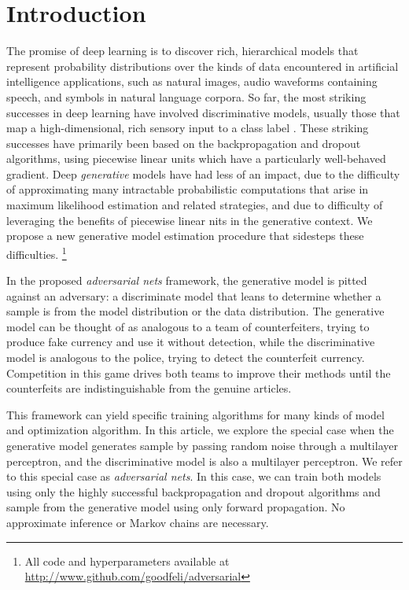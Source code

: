 \section{Introduction}
The promise of deep learning is to discover rich, hierarchical models \cite{2_MAL-006} that represent probability distributions over the kinds of data encountered in artificial intelligence applications, such as natural images, audio waveforms containing speech, and symbols in natural language corpora. So far, the most striking successes in deep learning have involved discriminative models, usually those that map a high-dimensional, rich sensory input to a class label \cite{14_6296526, 22_NIPS2012_c399862d}. These striking successes have primarily been based on the backpropagation and dropout algorithms, using piecewise linear units \cite{19_5459469,9_pmlr-v15-glorot11a,10_goodfellow2013maxoutnetworks} which have a particularly well-behaved gradient. Deep \emph{generative} models have had less of an impact, due to the difficulty of approximating many intractable probabilistic computations that arise in maximum likelihood estimation and related strategies, and due to difficulty of leveraging the benefits of piecewise linear nits in the generative context. We propose a new generative model estimation procedure that sidesteps these difficulties.
\footnote{All code and hyperparameters available at \url{http://www.github.com/goodfeli/adversarial}}

\noindent In the proposed \emph{adversarial nets} framework, the generative model is pitted against an adversary: a discriminate model that leans to determine whether a sample is from the model distribution or the data distribution. The generative model can be thought of as analogous to a team of counterfeiters, trying to produce fake currency and use it without detection, while the discriminative model is analogous to the police, trying to detect the counterfeit currency. Competition in this game drives both teams to improve their methods until the counterfeits are indistinguishable
from the genuine articles.

\noindent This framework can yield specific training algorithms for many kinds of model and optimization algorithm. In this article, we explore the special case when the generative model generates sample by passing random noise through a multilayer perceptron, and the discriminative model is also a multilayer perceptron. We refer to this special case as \emph{adversarial nets}. In this case, we can train both models using only the highly successful backpropagation and dropout algorithms \cite{17_hinton2012improvingneuralnetworkspreventing} and sample from the generative model using only forward propagation. No approximate inference or Markov chains are necessary.

